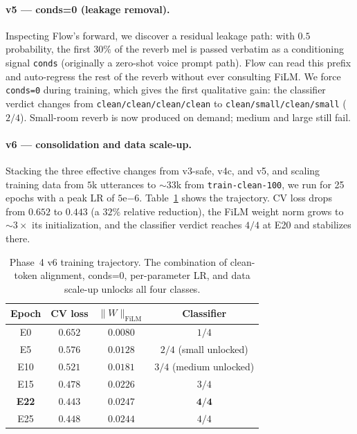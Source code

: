 \documentclass{article}
\begin{document}
\paragraph{v5 --- conds=0 (leakage removal).} Inspecting Flow's forward,
we discover a residual leakage path: with $0.5$ probability, the first $30\%$
of the reverb mel is passed verbatim as a conditioning signal \texttt{conds}
(originally a zero-shot voice prompt path). Flow can read this prefix and
auto-regress the rest of the reverb without ever consulting FiLM. We force
\texttt{conds=0} during training, which gives the first qualitative gain: the
classifier verdict changes from \texttt{clean/clean/clean/clean} to
\texttt{clean/small/clean/small} ($2/4$). Small-room reverb is now produced
on demand; medium and large still fail.

\paragraph{v6 --- consolidation and data scale-up.} Stacking the three
effective changes from v3-safe, v4c, and v5, and scaling training data from
$5$k utterances to $\sim 33$k from \texttt{train-clean-100}, we run for
25 epochs with a peak LR of $5\mathrm{e}{-6}$. Table~\ref{tab:v6} shows
the trajectory. CV loss drops from $0.652$ to $0.443$ (a $32\%$ relative
reduction), the FiLM weight norm grows to $\sim 3\times$ its initialization,
and the classifier verdict reaches $4/4$ at E20 and stabilizes there.

\begin{table}[h]
\centering
\small
\begin{tabular}{cccc}
\toprule
Epoch & CV loss & $\|W\|_{\text{FiLM}}$ & Classifier \\
\midrule
E0  & $0.652$ & $0.0080$ & $1/4$ \\
E5  & $0.576$ & $0.0128$ & $2/4$ (small unlocked) \\
E10 & $0.521$ & $0.0181$ & $3/4$ (medium unlocked) \\
E15 & $0.478$ & $0.0226$ & $3/4$ \\
\textbf{E22} & $\mathbf{0.443}$ & $\mathbf{0.0247}$ & $\mathbf{4/4}$ \\
E25 & $0.448$ & $0.0244$ & $4/4$ \\
\bottomrule
\end{tabular}
\caption{Phase~4 v6 training trajectory. The combination of clean-token
alignment, conds=0, per-parameter LR, and data scale-up unlocks all four
classes.}
\label{tab:v6}
\end{table}
\end{document}
